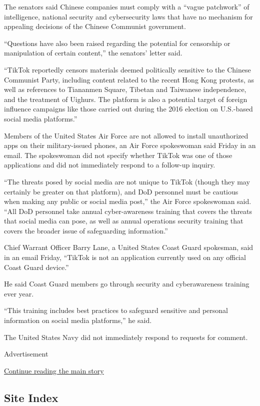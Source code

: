 The senators said Chinese companies must comply with a ``vague
patchwork'' of intelligence, national security and cybersecurity laws
that have no mechanism for appealing decisions of the Chinese Communist
government.

``Questions have also been raised regarding the potential for censorship
or manipulation of certain content,'' the senators' letter said.

``TikTok reportedly censors materials deemed politically sensitive to
the Chinese Communist Party, including content related to the recent
Hong Kong protests, as well as references to Tiananmen Square, Tibetan
and Taiwanese independence, and the treatment of Uighurs. The platform
is also a potential target of foreign influence campaigns like those
carried out during the 2016 election on U.S.-based social media
platforms.''

Members of the United States Air Force are not allowed to install
unauthorized apps on their military-issued phones, an Air Force
spokeswoman said Friday in an email. The spokeswoman did not specify
whether TikTok was one of those applications and did not immediately
respond to a follow-up inquiry.

``The threats posed by social media are not unique to TikTok (though
they may certainly be greater on that platform), and DoD personnel must
be cautious when making any public or social media post,'' the Air Force
spokeswoman said. ``All DoD personnel take annual cyber-awareness
training that covers the threats that social media can pose, as well as
annual operations security training that covers the broader issue of
safeguarding information.''

Chief Warrant Officer Barry Lane, a United States Coast Guard spokesman,
said in an email Friday, ``TikTok is not an application currently used
on any official Coast Guard device.''

He said Coast Guard members go through security and cyberawareness
training ever year.

``This training includes best practices to safeguard sensitive and
personal information on social media platforms,'' he said.

The United States Navy did not immediately respond to requests for
comment.

Advertisement

\protect\hyperlink{after-bottom}{Continue reading the main story}

\hypertarget{site-index}{%
\subsection{Site Index}\label{site-index}}

